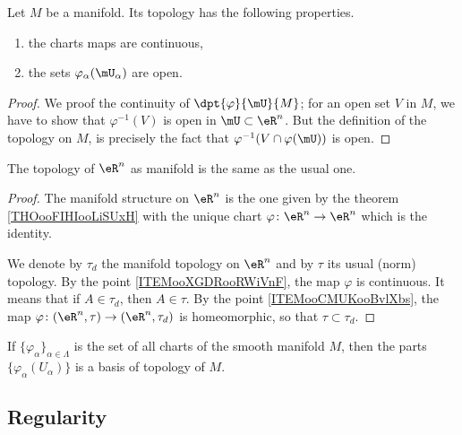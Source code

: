 \begin{theorem}     \label{THOooIAXUooDqMrav}
	Let \( M\) be a manifold. Its topology has the following properties.
	\begin{enumerate}
		\item the charts maps are continuous,
		\item the sets $\varphi_{\alpha}(\mU_{\alpha})$ are open.
	\end{enumerate}
\end{theorem}

\begin{proof}
	We proof the continuity of $\dpt{\varphi}{\mU}{M}$; for an open set $V$ in $M$, we have to show that $\varphi^{-1}(V)$ is open in $\mU\subset\eR^n$. But the definition of the topology on $M$, is precisely the fact that $\varphi^{-1}(V\cap\varphi(\mU))$ is open.
\end{proof}

\begin{lemma}       \label{LEMooGDMZooLCtnuA}
	The topology of \( \eR^n\) as manifold is the same as the usual one.
\end{lemma}

\begin{proof}
	The manifold structure on \( \eR^n\) is the one given by the theorem \ref{THOooFIHIooLiSUxH} with the unique chart \(\varphi \colon \eR^n\to \eR^n  \) which is the identity.

	We denote by \( \tau_d\) the manifold topology on \( \eR^n\) and by \( \tau\) its usual (norm) topology. By the point \ref{ITEMooXGDRooRWiVnF}, the map \( \varphi\) is continuous. It means that if \( A\in\tau_d\), then \( A\in \tau\). By the point \ref{ITEMooCMUKooBvlXbs}, the map \(\varphi \colon (\eR^n,\tau)\to (\eR^n,\tau_d)  \) is homeomorphic, so that \( \tau\subset\tau_d\).
\end{proof}

\begin{proposition}		\label{PROPooCXXKooJAOmOl}
	If \( \{ \varphi_{\alpha} \}_{\alpha\in \Lambda}\) is the set of all charts of the smooth manifold \( M\), then the parts \( \{ \varphi_{\alpha}(U_{\alpha}) \}\) is a basis of topology of \( M\).
\end{proposition}

\subsection{Regularity}


